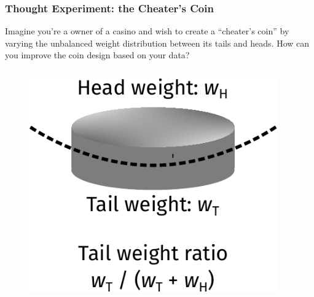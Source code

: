 \documentclass[10pt,aspectratio=169]{beamer}
\begin{document}
\begin{frame}
  \frametitle{Thought Experiment: the Cheater’s Coin}
  Imagine you’re a owner of a casino and wish to create a ``cheater's
  coin'' by varying the unbalanced weight distribution between its
  tails and heads. How can you improve the coin design based on your
  data?
  \vfill
  \begin{columns}[T]
    \begin{column}{0.20\textwidth}
      \begin{figure}[t]
        \includegraphics[width=\textwidth]{images/coin.pdf}
      \end{figure}
    \end{column}
    \begin{column}{0.75\textwidth}
    \end{column}
  \end{columns}

\end{frame}
    
    
    
\end{document}
